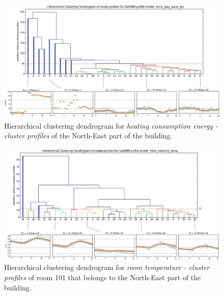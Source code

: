 \begin{landscape}
\begin{figure}[h!]
  \vspace{0.5em} %
  \includegraphics[scale=0.78]{Figures/dend_heating_NE_1.jpg}
  \caption{Hierarchical clustering dendrogram for \textit{heating consumption energy - cluster profiles} of the North-East part of the building.}
  \label{fig:dendrogram_heating_NE}
\end{figure}


\begin{figure}[h!]
  \vspace{0.5em} %
  \includegraphics[scale=0.78]{Figures/Dendrogran_room_temperature_NE.jpg}
  \caption{Hierarchical clustering dendrogram for \textit{room temperature - cluster profiles} of room 101 that belongs to the North-East part of the building.}
  \label{fig:dendrogram_room_temperature_NE}
\end{figure}




\end{landscape}
\restoregeometry





